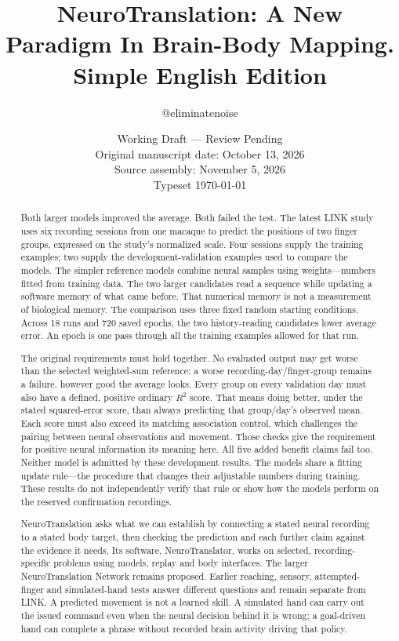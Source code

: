 \documentclass[11pt,a4paper]{article}
\renewcommand{\_}{\char95\relax}
\begin{document}
\title{NeuroTranslation: A New Paradigm In Brain-Body Mapping.\\[.4em]\large Simple English Edition}
\author{@eliminatenoise}
\date{Working Draft — Review Pending\\Original manuscript date: October 13, 2026\\Source assembly: November 5, 2026\\Typeset \today}
\maketitle

\begin{abstract}
Both larger models improved the average. Both failed the test. The latest LINK study uses six recording sessions from one macaque to predict the positions of two finger groups, expressed on the study's normalized scale. Four sessions supply the training examples; two supply the development-validation examples used to compare the models. The simpler reference models combine neural samples using weights---numbers fitted from training data. The two larger candidates read a sequence while updating a software memory of what came before. That numerical memory is not a measurement of biological memory. The comparison uses three fixed random starting conditions. Across 18 runs and 720 saved epochs, the two history-reading candidates lower average error. An epoch is one pass through all the training examples allowed for that run.

The original requirements must hold together. No evaluated output may get worse than the selected weighted-sum reference: a worse recording-day/finger-group remains a failure, however good the average looks. Every group on every validation day must also have a defined, positive ordinary $R^2$ score. That means doing better, under the stated squared-error score, than always predicting that group/day's observed mean. Each score must also exceed its matching association control, which challenges the pairing between neural observations and movement. Those checks give the requirement for positive neural information its meaning here. All five added benefit claims fail too. Neither model is admitted by these development results. The models share a fitting update rule---the procedure that changes their adjustable numbers during training. These results do not independently verify that rule or show how the models perform on the reserved confirmation recordings.

NeuroTranslation asks what we can establish by connecting a stated neural recording to a stated body target, then checking the prediction and each further claim against the evidence it needs. Its software, NeuroTranslator, works on selected, recording-specific problems using models, replay and body interfaces. The larger NeuroTranslation Network remains proposed. Earlier reaching, sensory, attempted-finger and simulated-hand tests answer different questions and remain separate from LINK. A predicted movement is not a learned skill. A simulated hand can carry out the issued command even when the neural decision behind it is wrong; a goal-driven hand can complete a phrase without recorded brain activity driving that policy.


\end{abstract}
\end{document}
